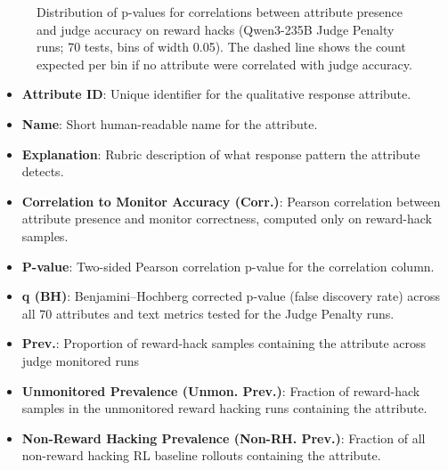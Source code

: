 \documentclass{article}
\begin{document}
\begin{figure}[h]
\centering
{}
\caption{Distribution of p-values for correlations between attribute presence and judge accuracy on reward hacks (Qwen3-235B Judge Penalty runs; 70 tests, bins of width 0.05). The dashed line shows the count expected per bin if no attribute were correlated with judge accuracy.}
\label{fig:attr-pvalue-hist}
\end{figure}
\begin{itemize}
    \item \textbf{Attribute ID}: Unique identifier for the qualitative response attribute.
    \item \textbf{Name}: Short human-readable name for the attribute.
    \item \textbf{Explanation}: Rubric description of what response pattern the attribute detects.
    \item \textbf{Correlation to Monitor Accuracy (Corr.)}: Pearson correlation between attribute presence and monitor correctness, computed only on reward-hack samples.
    \item \textbf{P-value}: Two-sided Pearson correlation p-value for the correlation column.
    \item \textbf{q (BH)}: Benjamini--Hochberg corrected p-value (false discovery rate) across all 70 attributes and text metrics tested for the Judge Penalty runs.
    \item \textbf{Prev.}: Proportion of reward-hack samples containing the attribute across judge monitored runs
    \item \textbf{Unmonitored Prevalence (Unmon. Prev.)}: Fraction of reward-hack samples in the unmonitored reward hacking runs containing the attribute.
    \item \textbf{Non-Reward Hacking Prevalence (Non-RH. Prev.)}: Fraction of all non-reward hacking RL baseline rollouts containing the attribute.
\end{itemize}
\end{document}

